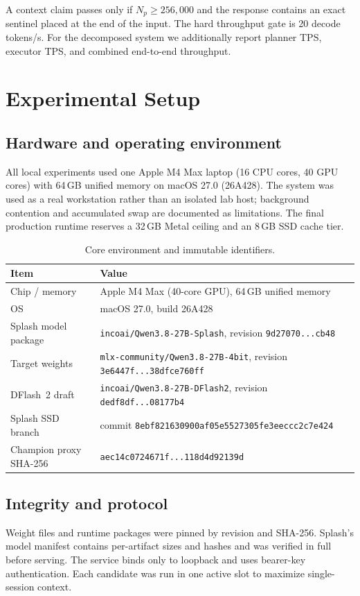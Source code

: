 \documentclass[11pt]{article}
\begin{document}
A context claim passes only if $N_p\ge256{,}000$ and the response contains an exact sentinel placed at the end of the input. The hard throughput gate is 20 decode tokens/s. For the decomposed system we additionally report planner TPS, executor TPS, and combined end-to-end throughput.

\section{Experimental Setup}
\subsection{Hardware and operating environment}
All local experiments used one Apple M4 Max laptop (16 CPU cores, 40 GPU cores) with 64\,GB unified memory on macOS 27.0 (26A428). The system was used as a real workstation rather than an isolated lab host; background contention and accumulated swap are documented as limitations. The final production runtime reserves a 32\,GB Metal ceiling and an 8\,GB SSD cache tier.

\begin{table}[H]
\centering
\caption{Core environment and immutable identifiers.}
\small
\begin{tabularx}{\linewidth}{lX}
\toprule
Item & Value \\
\midrule
Chip / memory & Apple M4 Max (40-core GPU), 64\,GB unified memory \\
OS & macOS 27.0, build 26A428 \\
Splash model package & \texttt{incoai/Qwen3.8-27B-Splash}, revision \texttt{9d27070...cb48} \\
Target weights & \texttt{mlx-community/Qwen3.8-27B-4bit}, revision \texttt{3e6447f...38dfce760ff} \\
DFlash~2 draft & \texttt{incoai/Qwen3.8-27B-DFlash2}, revision \texttt{dedf8df...08177b4} \\
Splash SSD branch & commit \texttt{8ebf821630900af05e5527305fe3eeccc2c7e424} \\
Champion proxy SHA-256 & \texttt{aec14c0724671f...118d4d92139d} \\
\bottomrule
\end{tabularx}
\end{table}

\subsection{Integrity and protocol}
Weight files and runtime packages were pinned by revision and SHA-256. Splash's model manifest contains per-artifact sizes and hashes and was verified in full before serving. The service binds only to loopback and uses bearer-key authentication. Each candidate was run in one active slot to maximize single-session context.
\end{document}
